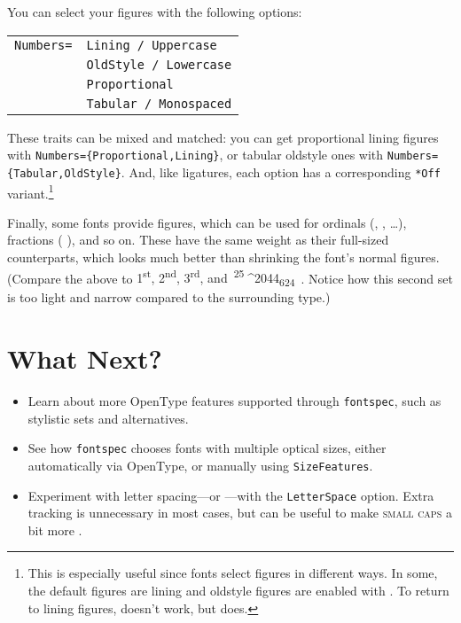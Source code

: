 You can select your figures with the following options:
\begin{leftfigure}
\begin{tabular}{l l}
\texttt{Numbers=} & \texttt{Lining / Uppercase} \\
 & \texttt{OldStyle / Lowercase} \\
 & \texttt{Proportional} \\
 & \texttt{Tabular / Monospaced}
\end{tabular}
\end{leftfigure}
These traits can be mixed and matched:
you can get proportional lining figures
with \texttt{Numbers=\{Proportional,\allowbreak Lining\}},
or tabular oldstyle ones with \texttt{Numbers=\{Tabular,\allowbreak OldStyle\}}.
And, like ligatures, each option has a corresponding \verb|*Off|
variant.\punckern\footnote{This is especially useful since fonts
select figures in different ways.
In some, the default figures are lining
and oldstyle figures are enabled with
.
To return to lining figures,
doesn't work, but
does.}

Finally, some fonts provide  figures,
which can be used for ordinals
(,  , \ldots),
fractions (\,\,), and so on.
These have the same weight as their full-sized counterparts,
which looks much better than shrinking the font's normal figures.
(Compare the above to
{%
\mbox{1\textsuperscript{st}},
\mbox{2\textsuperscript{nd}},
\mbox{3\textsuperscript{rd}},
and
\,\mbox{\textsuperscript{25}^^^^2044\textsubscript{624}}%
\,}.
Notice how this second set is too light and narrow compared to the surrounding
type.)

\section{What Next?}
\begin{itemize}
\item Learn about more OpenType features supported through \texttt{fontspec},
such as stylistic sets and alternatives.
\item See how \texttt{fontspec} chooses fonts with multiple optical sizes,
    either automatically via OpenType, or manually using \texttt{SizeFeatures}.
\item Experiment with letter spacing---or ---with
    the \texttt{LetterSpace} option.
    Extra tracking is unnecessary in most cases,
    but can be useful to make \textsc{small caps}
    a bit more .
\end{itemize}

